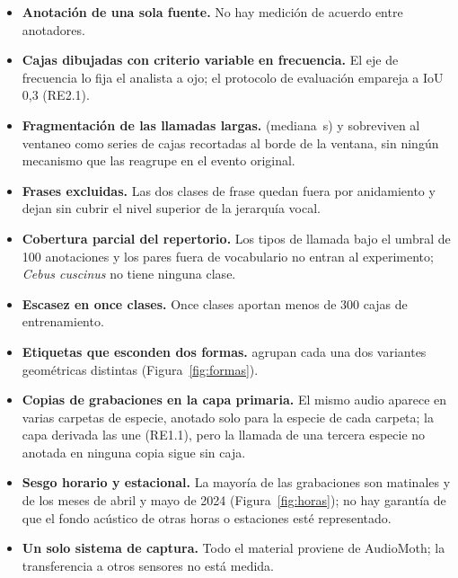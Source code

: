 \documentclass[12pt,a4paper]{article}
\begin{document}
\begin{itemize}
    \item \textbf{Anotación de una sola fuente.} No hay medición de acuerdo entre anotadores.
    \item \textbf{Cajas dibujadas con criterio variable en frecuencia.} El eje de frecuencia
          lo fija el analista a ojo; el protocolo de evaluación empareja a IoU 0,3 (RE2.1).
    \item \textbf{Fragmentación de las llamadas largas.} \longestClass{} (mediana
          \longestClassS{}\,s) y  sobreviven al ventaneo como series de cajas
          recortadas al borde de la ventana, sin ningún mecanismo que las reagrupe en el
          evento original.
    \item \textbf{Frases excluidas.} Las dos clases de frase quedan fuera por anidamiento y
          dejan sin cubrir el nivel superior de la jerarquía vocal.
    \item \textbf{Cobertura parcial del repertorio.} Los tipos de llamada bajo el umbral de
          100 anotaciones y los \nReviewPairs{} pares fuera de vocabulario no entran al
          experimento; \textit{Cebus cuscinus} no tiene ninguna clase.
    \item \textbf{Escasez en once clases.} Once clases aportan menos de 300 cajas de
          entrenamiento.
    \item \textbf{Etiquetas que esconden dos formas.} \splitShapes{} agrupan cada una dos
          variantes geométricas distintas (Figura~\ref{fig:formas}).
    \item \textbf{Copias de grabaciones en la capa primaria.} El mismo audio aparece en varias
          carpetas de especie, anotado solo para la especie de cada carpeta; la capa derivada las
          une (RE1.1), pero la llamada de una tercera especie no anotada en ninguna copia
          sigue sin caja.
    \item \textbf{Sesgo horario y estacional.} La mayoría de las grabaciones son matinales y de
          los meses de abril y mayo de 2024 (Figura~\ref{fig:horas}); no hay garantía de que el
          fondo acústico de otras horas o estaciones esté representado.
    \item \textbf{Un solo sistema de captura.} Todo el material proviene de AudioMoth; la
          transferencia a otros sensores no está medida. 
\end{itemize}

\clearpage


\end{document}

